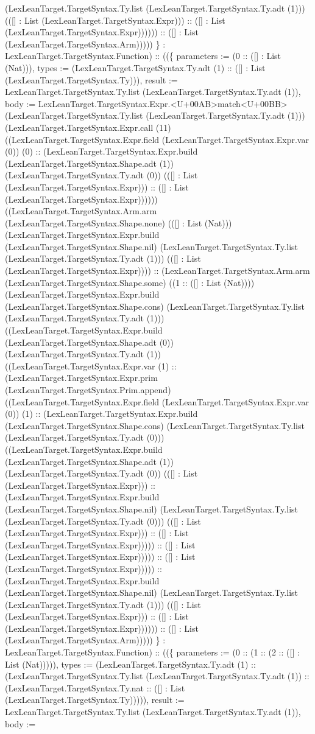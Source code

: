 \documentclass[11pt]{article}
\begin{document}
(LexLeanTarget.TargetSyntax.Ty.list (LexLeanTarget.TargetSyntax.Ty.adt (1))) (([] : List (LexLeanTarget.TargetSyntax.Expr))) :: ([] : List (LexLeanTarget.TargetSyntax.Expr)))))) :: ([] : List (LexLeanTarget.TargetSyntax.Arm))))) \} : LexLeanTarget.TargetSyntax.Function) :: ((\{ parameters := (0 :: ([] : List (Nat))), types := (LexLeanTarget.TargetSyntax.Ty.adt (1) :: ([] : List (LexLeanTarget.TargetSyntax.Ty))), result := LexLeanTarget.TargetSyntax.Ty.list (LexLeanTarget.TargetSyntax.Ty.adt (1)), body := LexLeanTarget.TargetSyntax.Expr.<U+00AB>match<U+00BB> (LexLeanTarget.TargetSyntax.Ty.list (LexLeanTarget.TargetSyntax.Ty.adt (1))) (LexLeanTarget.TargetSyntax.Expr.call (11) ((LexLeanTarget.TargetSyntax.Expr.field (LexLeanTarget.TargetSyntax.Expr.var (0)) (0) :: (LexLeanTarget.TargetSyntax.Expr.build (LexLeanTarget.TargetSyntax.Shape.adt (1)) (LexLeanTarget.TargetSyntax.Ty.adt (0)) (([] : List (LexLeanTarget.TargetSyntax.Expr))) :: ([] : List (LexLeanTarget.TargetSyntax.Expr)))))) ((LexLeanTarget.TargetSyntax.Arm.arm (LexLeanTarget.TargetSyntax.Shape.none) (([] : List (Nat))) (LexLeanTarget.TargetSyntax.Expr.build (LexLeanTarget.TargetSyntax.Shape.nil) (LexLeanTarget.TargetSyntax.Ty.list (LexLeanTarget.TargetSyntax.Ty.adt (1))) (([] : List (LexLeanTarget.TargetSyntax.Expr)))) :: (LexLeanTarget.TargetSyntax.Arm.arm (LexLeanTarget.TargetSyntax.Shape.some) ((1 :: ([] : List (Nat)))) (LexLeanTarget.TargetSyntax.Expr.build (LexLeanTarget.TargetSyntax.Shape.cons) (LexLeanTarget.TargetSyntax.Ty.list (LexLeanTarget.TargetSyntax.Ty.adt (1))) ((LexLeanTarget.TargetSyntax.Expr.build (LexLeanTarget.TargetSyntax.Shape.adt (0)) (LexLeanTarget.TargetSyntax.Ty.adt (1)) ((LexLeanTarget.TargetSyntax.Expr.var (1) :: (LexLeanTarget.TargetSyntax.Expr.prim (LexLeanTarget.TargetSyntax.Prim.append) ((LexLeanTarget.TargetSyntax.Expr.field (LexLeanTarget.TargetSyntax.Expr.var (0)) (1) :: (LexLeanTarget.TargetSyntax.Expr.build (LexLeanTarget.TargetSyntax.Shape.cons) (LexLeanTarget.TargetSyntax.Ty.list (LexLeanTarget.TargetSyntax.Ty.adt (0))) ((LexLeanTarget.TargetSyntax.Expr.build (LexLeanTarget.TargetSyntax.Shape.adt (1)) (LexLeanTarget.TargetSyntax.Ty.adt (0)) (([] : List (LexLeanTarget.TargetSyntax.Expr))) :: (LexLeanTarget.TargetSyntax.Expr.build (LexLeanTarget.TargetSyntax.Shape.nil) (LexLeanTarget.TargetSyntax.Ty.list (LexLeanTarget.TargetSyntax.Ty.adt (0))) (([] : List (LexLeanTarget.TargetSyntax.Expr))) :: ([] : List (LexLeanTarget.TargetSyntax.Expr))))) :: ([] : List (LexLeanTarget.TargetSyntax.Expr))))) :: ([] : List (LexLeanTarget.TargetSyntax.Expr))))) :: (LexLeanTarget.TargetSyntax.Expr.build (LexLeanTarget.TargetSyntax.Shape.nil) (LexLeanTarget.TargetSyntax.Ty.list (LexLeanTarget.TargetSyntax.Ty.adt (1))) (([] : List (LexLeanTarget.TargetSyntax.Expr))) :: ([] : List (LexLeanTarget.TargetSyntax.Expr)))))) :: ([] : List (LexLeanTarget.TargetSyntax.Arm))))) \} : LexLeanTarget.TargetSyntax.Function) :: ((\{ parameters := (0 :: (1 :: (2 :: ([] : List (Nat))))), types := (LexLeanTarget.TargetSyntax.Ty.adt (1) :: (LexLeanTarget.TargetSyntax.Ty.list (LexLeanTarget.TargetSyntax.Ty.adt (1)) :: (LexLeanTarget.TargetSyntax.Ty.nat :: ([] : List (LexLeanTarget.TargetSyntax.Ty))))), result := LexLeanTarget.TargetSyntax.Ty.list (LexLeanTarget.TargetSyntax.Ty.adt (1)), body := 
\end{document}
